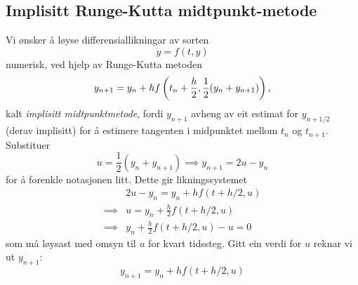 \documentclass[12pt]{article}
\begin{document}
\begin{multicols*}{2}
    \subsection{Implisitt Runge-Kutta midtpunkt-metode}
    Vi ønsker å løyse differensiallikningar av sorten
    \[
        \dot y = f(t, y)
    \]
    numerisk, ved hjelp av Runge-Kutta metoden
    \begin{equation}
        y_{n + 1} = y_n + h f\left( t_n + \frac{h}{2}, \frac{1}{2}(y_n + y_{n + 1})\right) \text,
        \label{mpm}
    \end{equation}
    kalt {\em implisitt midtpunktmetode}, fordi $y_{n+1}$ avheng
    av eit estimat for $y_{n+1/2}$ (derav implisitt)
    for å estimere tangenten i midpunktet mellom $t_n$ og $t_{n+1}$.
    Substituer
    \[
        u = \frac 1 2 (y_n + y_{n + 1}) \implies y_{n+1} = 2u - y_n
    \]
    for å forenkle notasjonen litt.
    Dette gir likningssystemet
    \begin{align*}
                 & 2u - y_n = y_n + h f\left( t + h/2, u \right) \\
        \implies & u = y_n + \frac h 2 f\left( t+h/2, u \right) \\
        \implies & y_n + \frac h 2 f\left( t+h/2, u \right) - u = 0
    \end{align*}
    som må løysast med omsyn til $u$ for kvart tidssteg.
    Gitt ein verdi for $u$ reknar vi ut $y_{n+1}$:
    \begin{equation}
        y_{n+1} = y_n + h f(t + h/2, u)
    \end{equation}


\end{multicols*}
\end{document}
